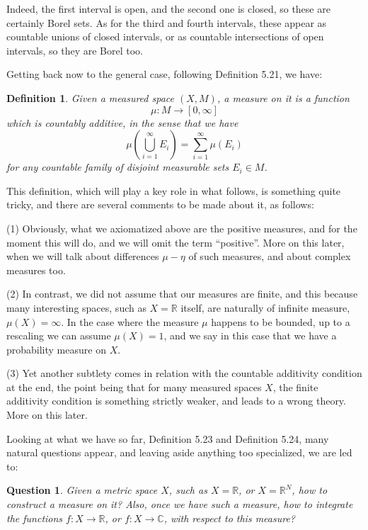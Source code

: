 \documentclass[12pt]{amsbook}
\newtheorem{definition}[theorem]{Definition}
\newtheorem{question}[theorem]{Question}
\begin{document}
Indeed, the first interval is open, and the second one is closed, so these are certainly Borel sets. As for the third and fourth intervals, these appear as countable unions of closed intervals, or as countable intersections of open intervals, so they are Borel too.

\bigskip

Getting back now to the general case, following Definition 5.21, we have:

\begin{definition}
Given a measured space $(X,M)$, a measure on it is a function
$$\mu:M\to[0,\infty]$$
which is countably additive, in the sense that we have
$$\mu\left(\bigcup_{i=1}^\infty E_i\right)=\sum_{i=1}^\infty\mu(E_i)$$
for any countable family of disjoint measurable sets $E_i\in M$.
\end{definition}

This definition, which will play a key role in what follows, is something quite tricky, and there are several comments to be made about it, as follows:

\bigskip

(1) Obviously, what we axiomatized above are the positive measures, and for the moment this will do, and we will omit the term ``positive''. More on this later, when we will talk about differences $\mu-\eta$ of such measures, and about complex measures too.

\bigskip

(2) In contrast, we did not assume that our measures are finite, and this because many interesting spaces, such as $X=\mathbb R$ itself, are naturally of infinite measure, $\mu(X)=\infty$. In the case where the measure $\mu$ happens to be bounded, up to a rescaling we can assume $\mu(X)=1$, and we say in this case that we have a probability measure on $X$.

\bigskip

(3) Yet another subtlety comes in relation with the countable additivity condition at the end, the point being that for many measured spaces $X$, the finite additivity condition is something strictly weaker, and leads to a wrong theory. More on this later.

\bigskip 

Looking at what we have so far, Definition 5.23 and Definition 5.24, many natural questions appear, and leaving aside anything too specialized, we are led to:

\begin{question}
Given a metric space $X$, such as $X=\mathbb R$, or $X=\mathbb R^N$, how to construct a measure on it? Also, once we have such a measure, how to integrate the functions $f:X\to\mathbb R$, or $f:X\to\mathbb C$, with respect to this measure?
\end{question}
\end{document}
